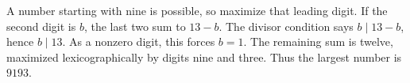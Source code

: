 A number starting with nine is possible, so maximize that leading digit. If the second digit is $b$, the last two sum to $13-b$. The divisor condition says $b\mid13-b$, hence $b\mid13$. As a nonzero digit, this forces $b=1$. The remaining sum is twelve, maximized lexicographically by digits nine and three. Thus the largest number is $\boxed{9193}$.
